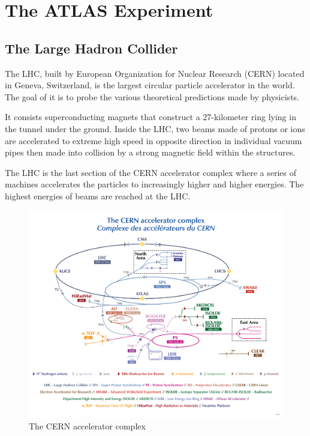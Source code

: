 \documentclass[UTF8,12pt]{ctexart}
\numberwithin{equation}{section}
\begin{document}
\newpage
{}
\section{The ATLAS Experiment}
\label{sec:3}

\subsection{The Large Hadron Collider}
\label{sec:3.1}

The LHC, built by European Organization for Nuclear Research (CERN) located in Geneva, Switzerland, is the largest circular particle accelerator in the world. The goal of it is to probe the various theoretical predictions made by physicists.
  
It consists superconducting magnets that construct a 27-kilometer ring lying in the tunnel under the ground. Inside the LHC, two beams made of protons or ions are accelerated to extreme high speed in opposite direction in individual vacuum pipes then made into collision by a strong magnetic field within the structures.

The LHC is the last section of the CERN accelerator complex where a series of machines accelerates the particles to increasingly higher and higher energies. The highest energies of beams are reached at the LHC.


 \begin{figure}[htb] 
 	\centering  
 		\includegraphics[width=15cm]{./fig/2022.png}
 		\caption{The CERN accelerator complex}
\end{figure}
 
\end{document}
